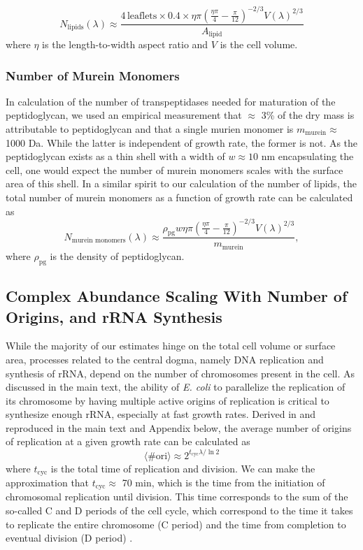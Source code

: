 \begin{equation}
    N_\text{lipids}(\lambda) \approx \frac{4\,\text{leaflets} \times 0.4 \times
    \eta\pi\left(\frac{\eta\pi}{4} -
    \frac{\pi}{12}\right)^{-2/3}V(\lambda)^{2/3}}{A_\text{lipid}}
\end{equation}
where $\eta$ is the length-to-width aspect ratio and $V$ is the cell volume.

\subsubsection{Number of Murein Monomers}
In calculation of the number of transpeptidases needed for maturation of the
peptidoglycan, we used an empirical measurement that $\approx$ 3\% of the dry
mass is attributable to peptidoglycan and that a single murien monomer is
$m_\text{murein} \approx$ 1000 Da. While the latter is independent of growth rate, the former is
not. As the peptidoglycan exists as a thin shell with a width of $w \approx 10$
nm encapsulating the cell, one would expect the number of murein monomers scales
with the surface area of this shell. In a similar spirit to our calculation of
the number of lipids, the total number of murein monomers as a function of
growth rate can be calculated as
\begin{equation}
N_\text{murein monomers}(\lambda) \approx \frac{\rho_\text{pg} w \eta\pi\left(\frac{\eta\pi}{4} -
    \frac{\pi}{12}\right)^{-2/3}V(\lambda)^{2/3}}{m_\text{murein}},
\end{equation}
where $\rho_\text{pg}$ is the density of peptidoglycan.


\subsection{Complex Abundance Scaling With Number of Origins, and rRNA Synthesis}
While the majority of our estimates hinge on the total cell volume or surface
area, processes related to the central dogma, namely DNA replication and
synthesis of rRNA, depend on the number of chromosomes present in the cell. As
discussed in the main text, the ability of \textit{E. coli} to parallelize the
replication of its chromosome by having multiple active origins of replication
is critical to synthesize enough rRNA, especially at fast growth
rates. Derived in \cite{si2017} and reproduced in the main text and Appendix  below, the average number of
origins of replication at a given growth rate can be calculated as
\begin{equation}
\langle\# \text{ori} \rangle \approx 2^{t_\text{cyc} \lambda / \ln 2}
\label{eq:nori}
\end{equation}
where $t_\text{cyc}$ is the total time of replication and division. We can make
the approximation that $t_\text{cyc} \approx$ 70 min, which is the  time from
the initiation of chromosomal replication until division. This time corresponds to
the sum of the so-called C and D periods of the cell cycle, which correspond to
the time it takes to replicate the entire chromosome (C period) and the time
from completion to eventual division (D period) \cite{helmstetter1968}.

